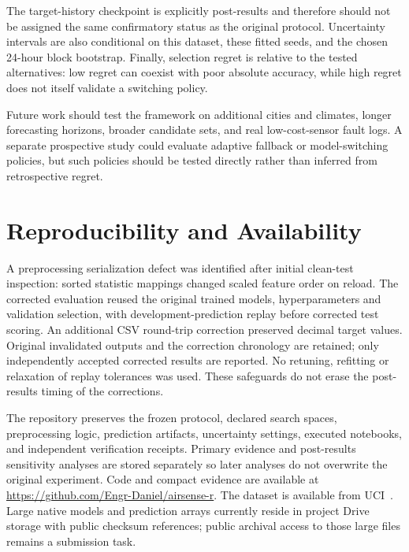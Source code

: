 \documentclass[journal]{IEEEtran}
\begin{document}
The target-history checkpoint is explicitly post-results and therefore should not be assigned the same confirmatory status as the original protocol. Uncertainty intervals are also conditional on this dataset, these fitted seeds, and the chosen 24-hour block bootstrap. Finally, selection regret is relative to the tested alternatives: low regret can coexist with poor absolute accuracy, while high regret does not itself validate a switching policy.

Future work should test the framework on additional cities and climates, longer forecasting horizons, broader candidate sets, and real low-cost-sensor fault logs. A separate prospective study could evaluate adaptive fallback or model-switching policies, but such policies should be tested directly rather than inferred from retrospective regret.

\section{Reproducibility and Availability}
A preprocessing serialization defect was identified after initial clean-test inspection: sorted statistic mappings changed scaled feature order on reload. The corrected evaluation reused the original trained models, hyperparameters and validation selection, with development-prediction replay before corrected test scoring. An additional CSV round-trip correction preserved decimal target values. Original invalidated outputs and the correction chronology are retained; only independently accepted corrected results are reported. No retuning, refitting or relaxation of replay tolerances was used. These safeguards do not erase the post-results timing of the corrections.

The repository preserves the frozen protocol, declared search spaces, preprocessing logic, prediction artifacts, uncertainty settings, executed notebooks, and independent verification receipts. Primary evidence and post-results sensitivity analyses are stored separately so later analyses do not overwrite the original experiment. Code and compact evidence are available at \url{https://github.com/Engr-Daniel/airsense-r}. The dataset is available from UCI~\cite{uci_beijing}. Large native models and prediction arrays currently reside in project Drive storage with public checksum references; public archival access to those large files remains a submission task.
\end{document}
